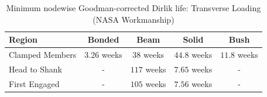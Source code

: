 \begin{table}[H]
    \centering
    \caption{Minimum nodewise Goodman-corrected Dirlik life: Transverse Loading (NASA Workmanship)}
    \label{tab:MinLife_transverse_nasa_nodewise_weeks}
    \begin{tabular}{lcccc}
        \toprule
        Region & Bonded & Beam & Solid & Bush \\
        \midrule
        Clamped Members & $3.26$ weeks & $38$ weeks & $44.8$ weeks & $11.8$ weeks \\
        Head to Shank & - & $117$ weeks & $7.65$ weeks & - \\
        First Engaged & - & $105$ weeks & $7.56$ weeks & - \\
        \bottomrule
    \end{tabular}
\end{table}
